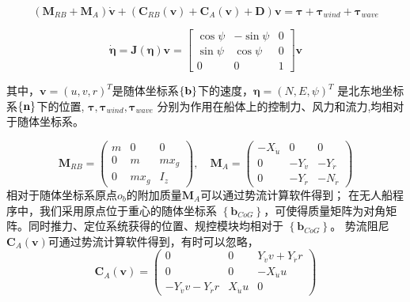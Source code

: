 \begin{equation}
  \label{eq:3dofmaneuvering}
  (\bm{M}_{RB}+\bm{M}_A) \dot{\bm{v}}+(\bm{C}_{RB}(\bm{v})+
  \bm{C}_{A}(\bm{v})+\bm{D})\bm{v}=\bm{\tau}+\bm{\tau}_{wind}+
  \bm{\tau}_{wave}
\end{equation}

\begin{equation}
  \label{eq:3doftransform}
  \dot{\bm{\eta}}=\bm{J}(\bm{\eta})\bm{v}=
  \begin{bmatrix}
    \cos{\psi} & -\sin{\psi} & 0 \\
    \sin{\psi} & \cos{\psi} & 0 \\
    0 & 0 & 1
  \end{bmatrix}
  \bm{v}
\end{equation}

其中，$\bm{v}=(u,v,r)^T$是随体坐标系$\left\{ \mathbf{b} \right\}$下的速度，$\bm{\eta}=(N,E,\psi)^T$
是北东地坐标系$\left\{ \mathbf{n} \right\}$下的位置, $\bm{\tau},\bm{\tau}_{wind}, \bm{\tau}_{wave}$
分别为作用在船体上的控制力、风力和流力,均相对于随体坐标系。

\begin{equation}
  \label{eq:massmatrix}
  \bm{M}_{RB}=\begin{pmatrix}
            m & 0 & 0 \\
            0 & m & mx_g \\
            0 & mx_g & I_z
          \end{pmatrix},
  \quad
  \bm{M}_{A}=\begin{pmatrix}
            -X_{\dot{u}} & 0 & 0 \\
            0 & -Y_{\dot{v}} & -Y_{\dot{r}} \\
            0 & -Y_{\dot{r}} & -N_{\dot{r}}
          \end{pmatrix}
\end{equation}
相对于随体坐标系原点$o_b$的附加质量$\bm{M}_{A}$可以通过势流计算软件得到；
{\color{red} 在无人船程序中，我们采用原点位于重心的随体坐标系
$\left\{ \bm{b}_{CoG} \right\}$，可使得质量矩阵为对角矩阵。同时推力、定位系统获得的位置、规控模块均相对于
$\left\{ \bm{b}_{CoG} \right\}$}。
势流阻尼$\bm{C}_{A}(\bm{v})$可通过势流计算软件得到，有时可以忽略，
\begin{equation}
  \label{eq:potentialdampingmatrix}
  \bm{C}_{A}(\bm{v})=
          \begin{pmatrix}
            0 & 0 &  Y_{\dot{v}}v+Y_{\dot{r}}r \\
            0 & 0 & -X_{\dot{u}}u \\
            -Y_{\dot{v}}v-Y_{\dot{r}}r & X_{\dot{u}}u & 0
          \end{pmatrix}
\end{equation}


